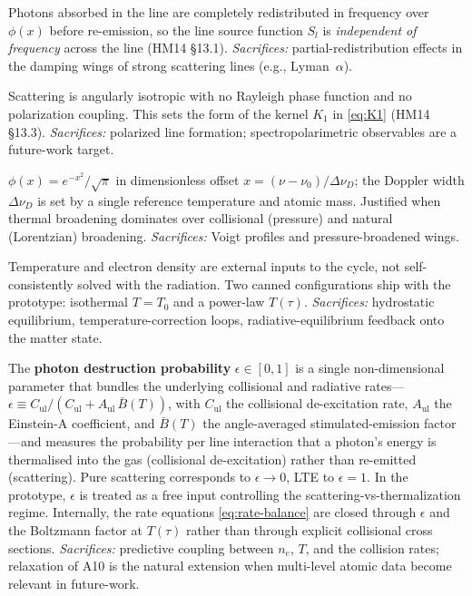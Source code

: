 \documentclass[11pt]{article}
\begin{document}
\begin{description}[itemsep=4pt,leftmargin=*]
\item[(A6) Complete redistribution (CRD) in the line.]
Photons absorbed in the line are completely redistributed in frequency
over $\phi(x)$ before re-emission, so the line source function $S_l$ is
\emph{independent of frequency} across the line (HM14 §13.1).
\emph{Sacrifices:} partial-redistribution effects in the damping wings
of strong scattering lines (e.g., Lyman~$\alpha$).

\item[(A7) Coherent isotropic scattering.]
Scattering is angularly isotropic with no Rayleigh phase function and
no polarization coupling.  This sets the form of the kernel $K_1$ in
\eqref{eq:K1} (HM14 §13.3).  \emph{Sacrifices:} polarized line
formation; spectropolarimetric observables are a future-work target.

\item[(A8) Doppler line profile.]
$\phi(x) = e^{-x^2}/\sqrt{\pi}$ in dimensionless offset $x = (\nu - \nu_0)/\Delta\nu_D$;
the Doppler width $\Delta\nu_D$ is set by a single reference temperature
and atomic mass.  Justified when thermal broadening dominates over
collisional (pressure) and natural (Lorentzian) broadening.
\emph{Sacrifices:} Voigt profiles and pressure-broadened wings.

\item[(A9) Prescribed thermodynamics ($T(\tau), n_e(\tau)$ fixed).]
Temperature and electron density are external inputs to the cycle, not
self-consistently solved with the radiation.  Two canned configurations
ship with the prototype: isothermal $T = T_0$ and a power-law
$T(\tau)$.  \emph{Sacrifices:} hydrostatic equilibrium,
temperature-correction loops, radiative-equilibrium feedback onto the
matter state.

\item[(A10) Master parameter $\epsilon$ rather than explicit collision rates.]
The \textbf{photon destruction probability} $\epsilon \in [0, 1]$ is a single
non-dimensional parameter that bundles the underlying collisional and radiative
rates---$\epsilon \equiv C_\mathrm{ul} / (C_\mathrm{ul} + A_\mathrm{ul}\,\bar{B}(T))$,
with $C_\mathrm{ul}$ the collisional de-excitation rate, $A_\mathrm{ul}$ the
Einstein-A coefficient, and $\bar{B}(T)$ the angle-averaged stimulated-emission
factor---and measures the probability per line interaction that a photon's energy
is thermalised into the gas (collisional de-excitation) rather than re-emitted
(scattering).  Pure scattering corresponds to $\epsilon \to 0$, LTE to
$\epsilon = 1$.  In the prototype, $\epsilon$ is treated as a free input
controlling the scattering-vs-thermalization regime.
Internally, the rate equations \eqref{eq:rate-balance} are closed
through $\epsilon$ and the Boltzmann factor at $T(\tau)$ rather than
through explicit collisional cross sections.  \emph{Sacrifices:}
predictive coupling between $n_e$, $T$, and the collision rates;
relaxation of A10 is the natural extension when multi-level atomic
data become relevant in future-work.

\end{description}
\end{document}
